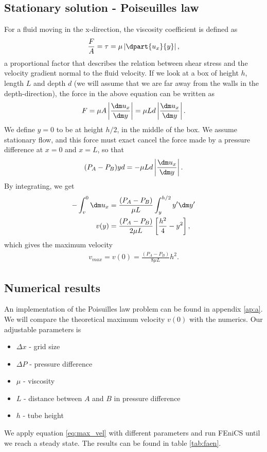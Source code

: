 \subsection{Stationary solution - Poiseuilles law}
For a fluid moving in the x-direction, the viscosity coefficient is defined as
\begin{align*}
  \frac{F}{A} = \tau = \mu\left|\dpart{u_x}{y}\right|,
\end{align*}
a proportional factor that describes the relation between shear stress and the velocity gradient normal to the fluid velocity. If we look at a box of height $h$, length $L$ and depth $d$ (we will assume that we are far away from the walls in the depth-direction), the force in the above equation can be written as
\begin{align*}
  F = \mu A \left|\frac{\dm u_x}{\dm y}\right| = \mu Ld\left|\frac{\dm u_x}{\dm y}\right|.
\end{align*}
We define $y=0$ to be at height $h/2$, in the middle of the box. We assume stationary flow, and this force must exact cancel the force made by a pressure difference at $x=0$ and $x=L$, so that
\begin{align*}
  (P_A - P_B)yd = -\mu Ld\left|\frac{\dm u_x}{\dm y}\right|.
\end{align*}
By integrating, we get
\begin{align*}
  -\int_v^0 \dm u_x  &= \frac{(P_A - P_B)}{\mu L}\int_y^{h/2}y'\dm y'\\
  v(y) &= \frac{(P_A - P_B)}{2\mu L}\left[\frac{h^2}{4}-y^2\right],
\end{align*}
which gives the maximum velocity
\begin{align}
  \label{eq:max_vel}
  v_{max} = v(0) = \frac{(P_A - P_B)}{8\mu L}h^2.
\end{align}
\subsection{Numerical results}
An implementation of the Poisuilles law problem can be found in appendix \ref{ap:a}. We will compare the theoretical maximum velocity $v(0)$ with the numerics. Our adjustable parameters is
\begin{itemize}
\item $\Delta x$ - grid size
\item $\Delta P$ - pressure difference
\item $\mu$ - viscosity
\item $L$ - distance between $A$ and $B$ in pressure difference
\item $h$ - tube height
\end{itemize}
We apply equation \eqref{eq:max_vel} with different parameters and run FEniCS until we reach a steady state. The results can be found in table \ref{tab:faen}.


